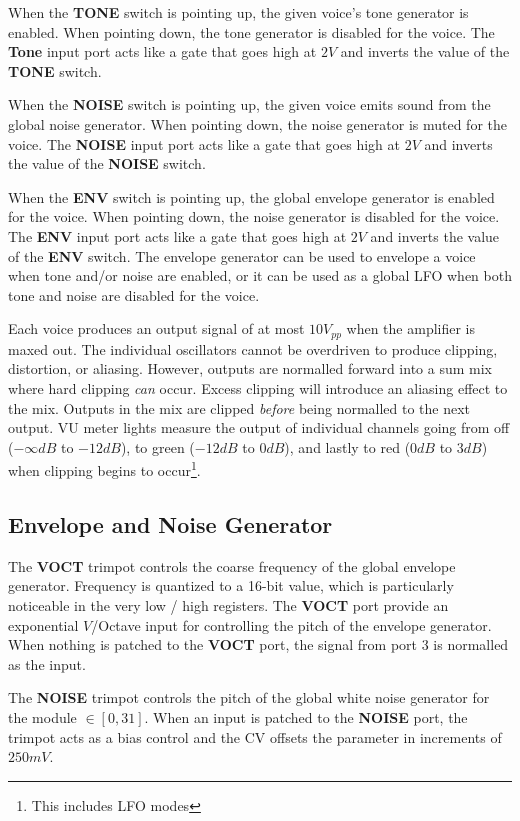\documentclass[12pt,letter]{article}
\begin{document}
When the \textbf{TONE} switch is pointing up, the given voice's tone generator is enabled. When pointing down, the tone generator is disabled for the voice. The \textbf{Tone} input port acts like a gate that goes high at $2V$ and inverts the value of the \textbf{TONE} switch.

When the \textbf{NOISE} switch is pointing up, the given voice emits sound from the global noise generator. When pointing down, the noise generator is muted for the voice. The \textbf{NOISE} input port acts like a gate that goes high at $2V$ and inverts the value of the \textbf{NOISE} switch.

When the \textbf{ENV} switch is pointing up, the global envelope generator is enabled for the voice. When pointing down, the noise generator is disabled for the voice. The \textbf{ENV} input port acts like a gate that goes high at $2V$ and inverts the value of the \textbf{ENV} switch. The envelope generator can be used to envelope a voice when tone and/or noise are enabled, or it can be used as a global LFO when both tone and noise are disabled for the voice.

Each voice produces an output signal of at most $10V_{pp}$ when the amplifier is maxed out. The individual oscillators cannot be overdriven to produce clipping, distortion, or aliasing. However, outputs are normalled forward into a sum mix where hard clipping \textit{can} occur. Excess clipping will introduce an aliasing effect to the mix. Outputs in the mix are clipped \textit{before} being normalled to the next output. VU meter lights measure the output of individual channels going from off ($-\infty dB$ to $-12dB$), to green ($-12dB$ to $0dB$), and lastly to red ($0dB$ to $3dB$) when clipping begins to occur\footnote{This includes LFO modes}.

\subsection{Envelope and Noise Generator}

The \textbf{VOCT} trimpot controls the coarse frequency of the global envelope generator. Frequency is quantized to a 16-bit value, which is particularly noticeable in the very low / high registers. The \textbf{VOCT} port provide an exponential $V$/Octave input for controlling the pitch of the envelope generator. When nothing is patched to the \textbf{VOCT} port, the signal from port 3 is normalled as the input.

The \textbf{NOISE} trimpot controls the pitch of the global white noise generator for the module $\in [0, 31]$. When an input is patched to the \textbf{NOISE} port, the trimpot acts as a bias control and the CV offsets the parameter in increments of $250mV$.
\end{document}
